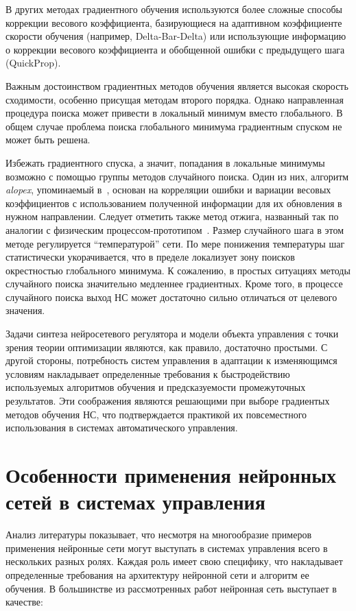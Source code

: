 В других методах градиентного обучения используются более сложные
способы коррекции весового коэффициента, базирующиеся на адаптивном
коэффициенте скорости обучения (например, Delta-Bar-Delta) или
использующие информацию о коррекции весового коэффициента и обобщенной
ошибки с предыдущего шага (QuickProp).

Важным достоинством градиентных методов обучения является высокая
скорость сходимости, особенно присущая методам второго порядка.
Однако направленная процедура поиска может привести в локальный
минимум вместо глобального.  В общем случае проблема поиска
глобального минимума градиентным спуском не может быть решена.

Избежать градиентного спуска, а значит, попадания в локальные минимумы
возможно с помощью группы методов случайного поиска.  Один из них,
алгоритм {\it alopex}, упоминаемый в~\cite{boquete99}, основан на
корреляции ошибки и вариации весовых коэффициентов с использованием
полученной информации для их обновления в нужном направлении.  Следует
отметить также метод отжига, названный так по аналогии с физическим
процессом-прототипом~\cite{wasser92}.  Размер случайного шага в этом
методе регулируется ``температурой'' сети.  По мере понижения
температуры шаг статистически укорачивается, что в пределе локализует
зону поисков окрестностью глобального минимума.  К сожалению, в
простых ситуациях методы случайного поиска значительно медленнее
градиентных.  Кроме того, в процессе случайного поиска выход НС может
достаточно сильно отличаться от целевого значения.

Задачи синтеза нейросетевого регулятора и модели объекта управления с
точки зрения теории оптимизации являются, как правило, достаточно
простыми.  С другой стороны, потребность систем управления в адаптации
к изменяющимся условиям накладывает определенные требования к
быстродействию используемых алгоритмов обучения и предсказуемости
промежуточных результатов.  Эти соображения являются решающими при
выборе градиентых методов обучения НС, что подтверждается практикой их
повсеместного использования в системах автоматического управления.

\section{Особенности применения нейронных сетей в системах управления}

Анализ литературы показывает, что несмотря на многообразие примеров
применения нейронные сети могут выступать в системах управления всего
в нескольких разных ролях.  Каждая роль имеет свою специфику, что
накладывает определенные требования на архитектуру нейронной сети и
алгоритм ее обучения.  В большинстве из рассмотренных работ нейронная
сеть выступает в качестве:

